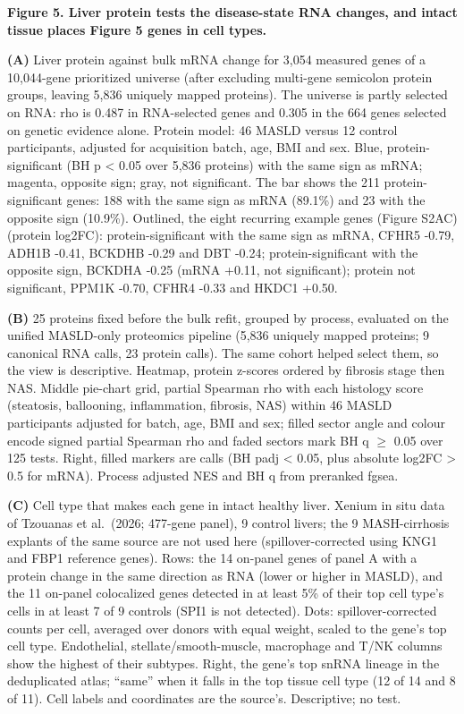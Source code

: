 \textbf{Figure 5. Liver protein tests the disease-state RNA changes, and intact tissue places Figure 5 genes in cell types.}

\textbf{(A)} Liver protein against bulk mRNA change for 3,054 measured genes of a 10,044-gene prioritized universe (after excluding multi-gene semicolon protein groups, leaving 5,836 uniquely mapped proteins). The universe is partly selected on RNA: rho is 0.487 in RNA-selected genes and 0.305 in the 664 genes selected on genetic evidence alone. Protein model: 46 MASLD versus 12 control participants, adjusted for acquisition batch, age, BMI and sex. Blue, protein-significant (BH p \textless{} 0.05 over 5,836 proteins) with the same sign as mRNA; magenta, opposite sign; gray, not significant. The bar shows the 211 protein-significant genes: 188 with the same sign as mRNA (89.1\%) and 23 with the opposite sign (10.9\%). Outlined, the eight recurring example genes (Figure S2AC) (protein log2FC): protein-significant with the same sign as mRNA, CFHR5 -0.79, ADH1B -0.41, BCKDHB -0.29 and DBT -0.24; protein-significant with the opposite sign, BCKDHA -0.25 (mRNA +0.11, not significant); protein not significant, PPM1K -0.70, CFHR4 -0.33 and HKDC1 +0.50.

\textbf{(B)} 25 proteins fixed before the bulk refit, grouped by process, evaluated on the unified MASLD-only proteomics pipeline (5,836 uniquely mapped proteins; 9 canonical RNA calls, 23 protein calls). The same cohort helped select them, so the view is descriptive. Heatmap, protein z-scores ordered by fibrosis stage then NAS. Middle pie-chart grid, partial Spearman rho with each histology score (steatosis, ballooning, inflammation, fibrosis, NAS) within 46 MASLD participants adjusted for batch, age, BMI and sex; filled sector angle and colour encode signed partial Spearman rho and faded sectors mark BH q $\ge$ 0.05 over 125 tests. Right, filled markers are calls (BH padj \textless{} 0.05, plus absolute log2FC \textgreater{} 0.5 for mRNA). Process adjusted NES and BH q from preranked fgsea.

\textbf{(C)} Cell type that makes each gene in intact healthy liver. Xenium in situ data of Tzouanas et al.~(2026; 477-gene panel), 9 control livers; the 9 MASH-cirrhosis explants of the same source are not used here (spillover-corrected using KNG1 and FBP1 reference genes). Rows: the 14 on-panel genes of panel A with a protein change in the same direction as RNA (lower or higher in MASLD), and the 11 on-panel colocalized genes detected in at least 5\% of their top cell type's cells in at least 7 of 9 controls (SPI1 is not detected). Dots: spillover-corrected counts per cell, averaged over donors with equal weight, scaled to the gene's top cell type. Endothelial, stellate/smooth-muscle, macrophage and T/NK columns show the highest of their subtypes. Right, the gene's top snRNA lineage in the deduplicated atlas; ``same'' when it falls in the top tissue cell type (12 of 14 and 8 of 11). Cell labels and coordinates are the source's. Descriptive; no test.

